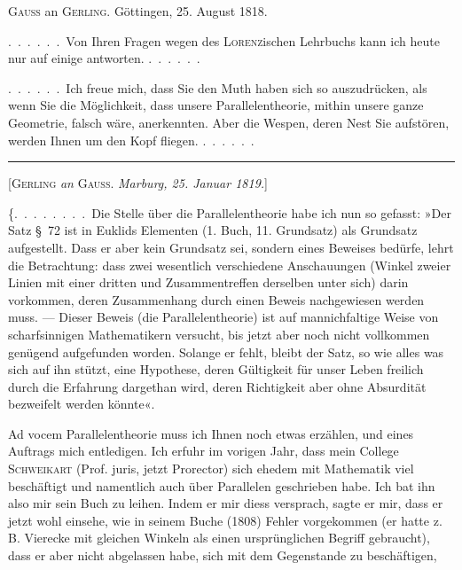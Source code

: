 \clearpage
\begin{center}\textsc{Gauss} an \textsc{Gerling}. Göttingen, 25. August 1818.\end{center}

.\ .\ .\ .\ .\ .\ Von Ihren Fragen wegen des \textsc{Lorenz}ischen Lehrbuchs kann ich
heute nur auf einige antworten. .\ .\ .\ .\ .\ .

.\ .\ .\ .\ .\ .\ Ich freue mich, dass Sie den Muth haben sich so auszudrücken, als
wenn Sie die Möglichkeit, dass unsere Parallelentheorie, mithin unsere ganze
Geometrie, falsch wäre, anerkennten. Aber die Wespen, deren Nest Sie
aufstören, werden Ihnen um den Kopf fliegen. .\ .\ .\ .\ .\ .

\begin{center}\rule{3cm}{0.4pt}\end{center}

\begin{center}[\textsc{Gerling} \emph{an} \textsc{Gauss}. \emph{Marburg, 25. Januar 1819.}]\end{center}

\{.\ .\ .\ .\ .\ .\ .\ .\ Die Stelle über die Parallelentheorie habe ich nun so gefasst:
»Der Satz \S\ 72 ist in Euklids Elementen (1. Buch, 11. Grundsatz) als
Grundsatz aufgestellt. Dass er aber kein Grundsatz sei, sondern eines
Beweises bedürfe, lehrt die Betrachtung: dass zwei wesentlich verschiedene
Anschauungen (Winkel zweier Linien mit einer dritten und Zusammentreffen
derselben unter sich) darin vorkommen, deren  Zusammenhang durch
einen Beweis nachgewiesen werden muss. --- Dieser Beweis (die
Parallelentheorie) ist auf mannichfaltige Weise von scharfsinnigen
Mathematikern versucht, bis jetzt aber noch nicht vollkommen genügend
aufgefunden worden. Solange er fehlt, bleibt der Satz, so wie alles was sich
auf ihn stützt, eine Hypothese, deren Gültigkeit für unser Leben freilich
durch die Erfahrung dargethan wird, deren 
Richtigkeit aber ohne Absurdität bezweifelt werden könnte«.

Ad vocem Parallelentheorie muss ich Ihnen noch etwas erzählen, und eines
Auftrags mich entledigen. Ich erfuhr im vorigen Jahr, dass mein College
\textsc{Schweikart} (Prof. juris, jetzt Prorector) sich ehedem mit
Mathematik viel beschäftigt und namentlich auch über Parallelen geschrieben
habe. Ich bat ihn also mir sein Buch zu leihen. Indem er mir diess
versprach, sagte er mir, dass er jetzt wohl einsehe, wie in seinem Buche
(1808) Fehler vorgekommen (er hatte z.\,B. Vierecke mit gleichen Winkeln als
einen ursprünglichen Begriff gebraucht), dass er aber nicht abgelassen habe,
sich mit dem Gegenstande zu beschäftigen,
